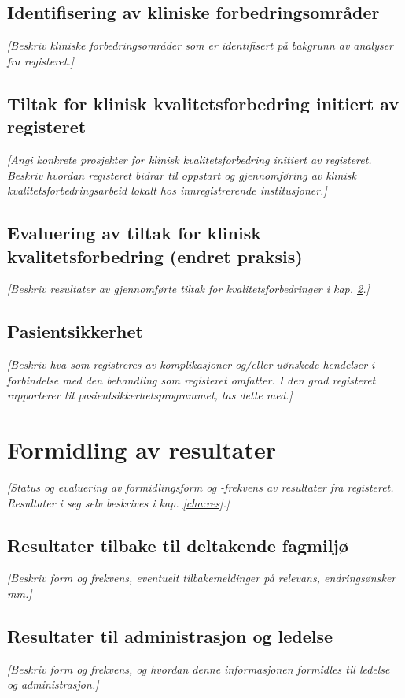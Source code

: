 \documentclass[norsk, a4paper, twocolumn]{report}
\newcommand{\guide}[1] {
	\textit{[\textcolor{guidegray}{#1}]}
	}
\begin{document}
\section{Identifisering av kliniske forbedringsområder}\label{sec:ide}
\guide{Beskriv kliniske forbedringsområder som er identifisert på bakgrunn
av analyser fra registeret.}

\section{Tiltak for klinisk kvalitetsforbedring initiert av
registeret}\label{sec:brures}
\guide{Angi konkrete prosjekter
for klinisk kvalitetsforbedring initiert av registeret. Beskriv
hvordan registeret bidrar til oppstart og gjennomføring
av klinisk kvalitetsforbedringsarbeid lokalt hos innregistrerende
institusjoner.}

\section{Evaluering av tiltak for klinisk kvalitetsforbedring (endret praksis)}\label{sec:evakva}
\guide{Beskriv resultater av gjennomførte tiltak for kvalitetsforbedringer
i kap. \ref{sec:brures}.}

\section{Pasientsikkerhet}\label{sec:kom}
\guide{Beskriv hva som registreres av komplikasjoner og/eller uønskede
hendelser i forbindelse med den behandling som registeret omfatter. I den grad
registeret rapporterer til pasientsikkerhetsprogrammet, tas dette med.}




\chapter{Formidling av resultater}\label{cha:dat}
\guide{Status og evaluering av formidlingsform og -frekvens
av resultater fra registeret. Resultater i seg selv beskrives i kap.
\ref{cha:res}.}

\section{Resultater tilbake til deltakende fagmiljø}\label{sec:resfag}
\guide{Beskriv form og frekvens,  eventuelt tilbakemeldinger på relevans,
endringsønsker mm.}

\section{Resultater til administrasjon og ledelse}\label{sec:resled}
\guide{Beskriv form og frekvens, og hvordan denne
informasjonen formidles til ledelse og administrasjon.}
\end{document}
